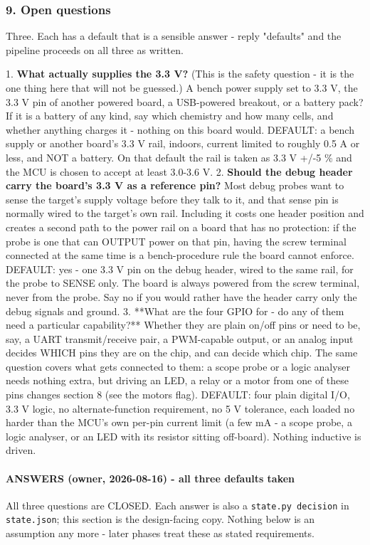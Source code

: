 \documentclass[11pt,a4paper]{article}
\begin{document}
\subsubsection*{9. Open questions}
Three. Each has a default that is a sensible answer - reply "defaults" and the pipeline proceeds on all three as written.

1. \textbf{What actually supplies the 3.3 V?} (This is the safety question - it is the one thing here that will not be guessed.) A bench power supply set to 3.3 V, the 3.3 V pin of another powered board, a USB-powered breakout, or a battery pack? If it is a battery of any kind, say which chemistry and how many cells, and whether anything charges it - nothing on this board would. DEFAULT: a bench supply or another board's 3.3 V rail, indoors, current limited to roughly 0.5 A or less, and NOT a battery. On that default the rail is taken as 3.3 V +/-5 \% and the MCU is chosen to accept at least 3.0-3.6 V. 2. \textbf{Should the debug header carry the board's 3.3 V as a reference pin?} Most debug probes want to sense the target's supply voltage before they talk to it, and that sense pin is normally wired to the target's own rail. Including it costs one header position and creates a second path to the power rail on a board that has no protection: if the probe is one that can OUTPUT power on that pin, having the screw terminal connected at the same time is a bench-procedure rule the board cannot enforce. DEFAULT: yes - one 3.3 V pin on the debug header, wired to the same rail, for the probe to SENSE only. The board is always powered from the screw terminal, never from the probe. Say no if you would rather have the header carry only the debug signals and ground. 3. {*}{*}What are the four GPIO for - do any of them need a particular capability?{*}{*} Whether they are plain on/off pins or need to be, say, a UART transmit/receive pair, a PWM-capable output, or an analog input decides WHICH pins they are on the chip, and can decide which chip. The same question covers what gets connected to them: a scope probe or a logic analyser needs nothing extra, but driving an LED, a relay or a motor from one of these pins changes section 8 (see the motors flag). DEFAULT: four plain digital I/O, 3.3 V logic, no alternate-function requirement, no 5 V tolerance, each loaded no harder than the MCU's own per-pin current limit (a few mA - a scope probe, a logic analyser, or an LED with its resistor sitting off-board). Nothing inductive is driven.

\paragraph*{ANSWERS (owner, 2026-08-16) - all three defaults taken}
All three questions are CLOSED. Each answer is also a \texttt{state.py decision} in \texttt{state.json}; this section is the design-facing copy. Nothing below is an assumption any more - later phases treat these as stated requirements.
\end{document}
